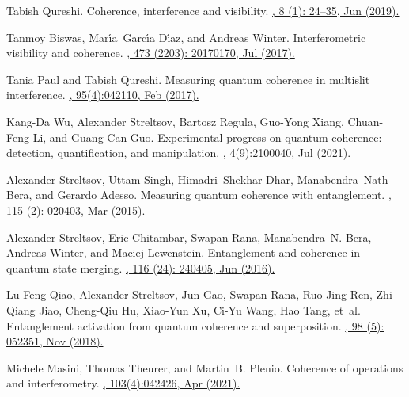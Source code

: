 \documentclass[a4paper,twocolumn,11pt,accepted=2024-01-17]{quantumarticle}
\begin{document}
\begin{thebibliography}{100}
Tabish Qureshi.
\newblock Coherence, interference and visibility.
\href{https://doi.org/10.12743/quanta.v8i1.87}{, 8 (1): 24--35, Jun (2019).}

Tanmoy Biswas, Mar{\'{\i}}a~Garc{\'{\i}}a D{\'{\i}}az, and Andreas Winter.
\newblock Interferometric visibility and coherence.
\href{https://doi.org/10.1098/rspa.2017.0170}{, 473 (2203): 20170170, Jul (2017).}

Tania Paul and Tabish Qureshi.
\newblock Measuring quantum coherence in multislit interference.
\href{https://doi.org/10.1103/PhysRevA.95.042110}{, 95(4):042110, Feb (2017).}

Kang-Da Wu, Alexander Streltsov, Bartosz Regula, Guo-Yong Xiang, Chuan-Feng Li,
  and Guang-Can Guo.
\newblock Experimental progress on quantum coherence: detection,
  quantification, and manipulation.
\href{https://doi.org/10.1002/qute.202100040}{, 4(9):2100040, Jul (2021).}

Alexander Streltsov, Uttam Singh, Himadri~Shekhar Dhar, Manabendra~Nath Bera,
  and Gerardo Adesso.
\newblock Measuring quantum coherence with entanglement.
\href{https://doi.org/10.1103/PhysRevLett.115.020403}{, 115 (2): 020403, Mar (2015).}

Alexander Streltsov, Eric Chitambar, Swapan Rana, Manabendra~N. Bera, Andreas
  Winter, and Maciej Lewenstein.
\newblock Entanglement and coherence in quantum state merging.
\href{https://doi.org/10.1103/PhysRevLett.116.240405}{, 116 (24): 240405, Jun (2016).}

Lu-Feng Qiao, Alexander Streltsov, Jun Gao, Swapan Rana, Ruo-Jing Ren,
  Zhi-Qiang Jiao, Cheng-Qiu Hu, Xiao-Yun Xu, Ci-Yu Wang, Hao Tang, et~al.
\newblock Entanglement activation from quantum coherence and superposition.
\href{https://doi.org/10.1103/PhysRevA.98.052351}{, 98 (5): 052351, Nov (2018).}

Michele Masini, Thomas Theurer, and Martin~B. Plenio.
\newblock Coherence of operations and interferometry.
\href{https://doi.org/10.1103/PhysRevA.103.042426}{, 103(4):042426, Apr (2021).}


\end{thebibliography}
\end{document}
